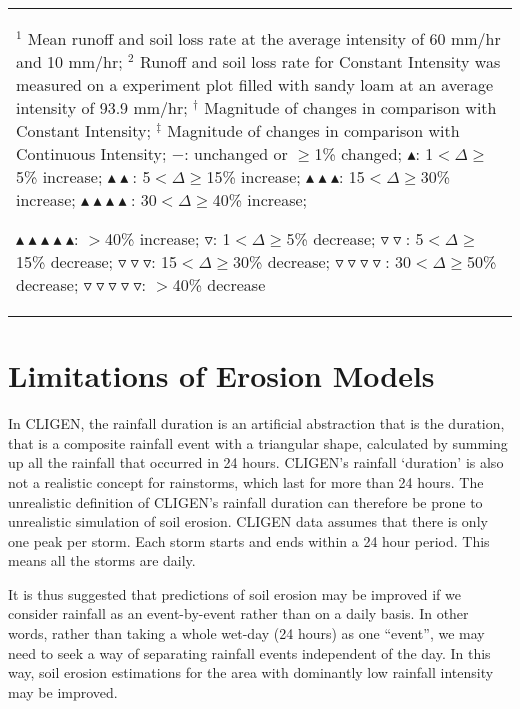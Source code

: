 \begin{sidewaystable}[htbp]
\begin{tabular}{llcccc}
    \bottomrule
    \multicolumn{6}{p{16cm}}{\scriptsize
    $^1$ Mean runoff and soil loss rate at the average intensity of 60 mm/hr and
10 mm/hr;
    $^2$ Runoff and soil loss rate for Constant Intensity was measured on a
experiment plot filled with sandy loam at an average intensity of 93.9 mm/hr;
    $^\dagger$ Magnitude of changes in comparison with Constant Intensity;
    $^\ddagger$ Magnitude of changes in comparison with Continuous Intensity;
    $-$: unchanged or $\geq$1\% changed;
    $\blacktriangle$: 1$<\Delta\geq$5\% increase;
    $\blacktriangle\blacktriangle$: 5$<\Delta\geq$15\% increase;
    $\blacktriangle\blacktriangle\blacktriangle$: 15$<\Delta\geq$30\%
increase;
    $\blacktriangle\blacktriangle\blacktriangle\blacktriangle$:
30$<\Delta\geq$40\% increase;

$\blacktriangle\blacktriangle\blacktriangle\blacktriangle\blacktriangle$:
$>$40\% increase;
    $\triangledown$: 1$<\Delta\geq$5\% decrease;
    $\triangledown\triangledown$: 5$<\Delta\geq$15\% decrease;
    $\triangledown\triangledown\triangledown$: 15$<\Delta\geq$30\% decrease;
    $\triangledown\triangledown\triangledown\triangledown$:
30$<\Delta\geq$50\% decrease;
    $\triangledown\triangledown\triangledown\triangledown\triangledown$:
$>$40\% decrease}\\
    \end{tabular}
\end{sidewaystable}

\section{Limitations of Erosion Models}
\label{sec:LimitationsOfErosionModels}

In CLIGEN, the rainfall duration is an artificial abstraction that is the
duration, that is a composite rainfall event with a triangular shape, calculated
by summing up all the rainfall that occurred in 24 hours. CLIGEN's rainfall
`duration' is also not a realistic concept for rainstorms, which last for more
than 24 hours. The unrealistic definition of CLIGEN's rainfall duration can
therefore be prone to unrealistic simulation of soil erosion. CLIGEN data
assumes that there is only one peak per storm. Each storm starts and ends within
a 24 hour period. This means all the storms are daily.

It is thus suggested that predictions of soil erosion may be improved if we
consider rainfall as an event-by-event rather than on a daily basis. In
other words, rather than taking a whole wet-day (24 hours) as one ``event'',
we may need to seek a way of separating rainfall events independent of the
day. In this way, soil erosion estimations for the area with dominantly low
rainfall intensity may be improved.


